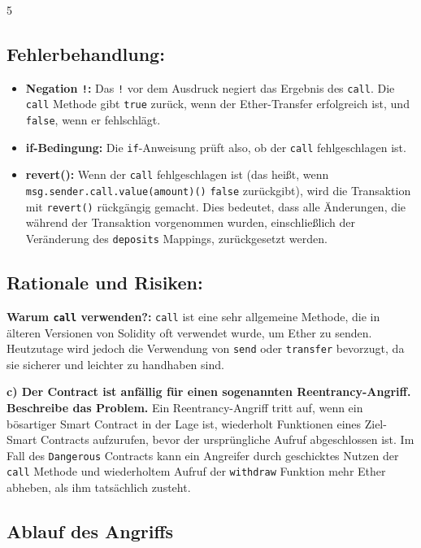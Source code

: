 \documentclass[german]{../uebung}
\begin{document}
\begin{exercise} {5}
    \subsection*{Fehlerbehandlung:}

    \begin{itemize}
        \item \textbf{Negation \texttt{!}:} Das \texttt{!} vor dem Ausdruck negiert das Ergebnis des \texttt{call}. Die \texttt{call} Methode gibt \texttt{true} zurück, wenn der Ether-Transfer erfolgreich ist, und \texttt{false}, wenn er fehlschlägt.
        \item \textbf{if-Bedingung:} Die \texttt{if}-Anweisung prüft also, ob der \texttt{call} fehlgeschlagen ist.
        \item \textbf{revert():} Wenn der \texttt{call} fehlgeschlagen ist (das heißt, wenn \texttt{msg.sender.call.value(amount)()} \texttt{false} zurückgibt), wird die Transaktion mit \texttt{revert()} rückgängig gemacht. Dies bedeutet, dass alle Änderungen, die während der Transaktion vorgenommen wurden, einschließlich der Veränderung des \texttt{deposits} Mappings, zurückgesetzt werden.
    \end{itemize}

    \subsection*{Rationale und Risiken:}

    \textbf{Warum \texttt{call} verwenden?:} \texttt{call} ist eine sehr allgemeine Methode, die in älteren Versionen von Solidity oft verwendet wurde, um Ether zu senden. Heutzutage wird jedoch die Verwendung von \texttt{send} oder \texttt{transfer} bevorzugt, da sie sicherer und leichter zu handhaben sind.

    \textbf{c) Der Contract ist anfällig für einen sogenannten Reentrancy-Angriff. Beschreibe das Problem.}
    Ein Reentrancy-Angriff tritt auf, wenn ein bösartiger Smart Contract in der Lage ist, wiederholt Funktionen eines Ziel-Smart Contracts aufzurufen, bevor der ursprüngliche Aufruf abgeschlossen ist. Im Fall des \texttt{Dangerous} Contracts kann ein Angreifer durch geschicktes Nutzen der \texttt{call} Methode und wiederholtem Aufruf der \texttt{withdraw} Funktion mehr Ether abheben, als ihm tatsächlich zusteht.

    \subsection*{Ablauf des Angriffs}


\end{exercise}
\end{document}
